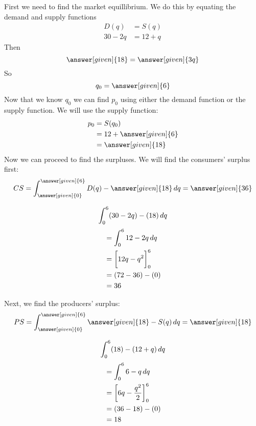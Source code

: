 \documentclass{ximera}
\begin{document}
\begin{example}
\begin{explanation}
First we need to find the market equillibrium. We do this by equating the demand and supply functions
\begin{align*}
  D(q) &= S(q) \\
  30-2q &= 12+q 
\end{align*} 
Then 
$$\answer[given]{18} = \answer[given]{3q}$$
So
$$q_{0}=\answer[given]{6}$$
Now that we know $q_{0}$ we can find $p_{0}$ using either the demand function or the supply function. We will
use the supply function:
\begin{align*}
  p_{0} &= S(q_{0}) \\
   	   &= 12+\answer[given]{6} \\
	   &= \answer[given]{18}
\end{align*}
Now we can proceed to find the surpluses. We will find the consumers' surplus first:
\[ 
CS = \int_{\answer[given]{0}}^{\answer[given]{6}} D(q) - \answer[given]{18} \d q = \answer[given]{36}
\]
\begin{hint}
\[
\int_0^6 (30-2q)-(18) \mathop{}\!d q
\]
\begin{align*}
  &=\int_0^6 12-2q \mathop{}\!d q \\
  &=\bigg[ 12q-q^2 \bigg]_0^6 \\
  &= (72-36)-(0) \\
  &=36
\end{align*}
\end{hint}
Next, we find the producers' surplus:
\[ 
PS = \int_{\answer[given]{0}}^{\answer[given]{6}}  \answer[given]{18}-S(q) \d q = \answer[given]{18}
\]
\begin{hint}
\[
\int_0^6 (18)-(12+q) \mathop{}\!d q
\]
\begin{align*}
  &=\int_0^6 6-q \mathop{}\!d q \\
  &=\bigg[ 6q-\frac{q^2}{2} \bigg]_0^6 \\
  &= (36-18)-(0) \\
  &=18
\end{align*}
\end{hint}
\end{explanation}
\end{example}
\end{document}
